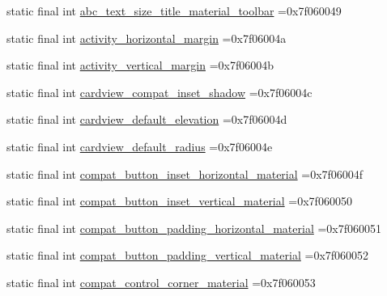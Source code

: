 \begin{DoxyCompactItemize}
\item 
static final int \mbox{\hyperlink{classbr_1_1unb_1_1cic_1_1mp_1_1marketmaster_1_1R_1_1dimen_ae527d11082d19eadaf91902af5296360}{abc\+\_\+text\+\_\+size\+\_\+title\+\_\+material\+\_\+toolbar}} =0x7f060049
\item 
static final int \mbox{\hyperlink{classbr_1_1unb_1_1cic_1_1mp_1_1marketmaster_1_1R_1_1dimen_a1b1c2b3ebf7bef5721d0a56ef94589ca}{activity\+\_\+horizontal\+\_\+margin}} =0x7f06004a
\item 
static final int \mbox{\hyperlink{classbr_1_1unb_1_1cic_1_1mp_1_1marketmaster_1_1R_1_1dimen_a741e01e4e126ddf97aeb83977e608c5b}{activity\+\_\+vertical\+\_\+margin}} =0x7f06004b
\item 
static final int \mbox{\hyperlink{classbr_1_1unb_1_1cic_1_1mp_1_1marketmaster_1_1R_1_1dimen_a0005323bb9a32e1b5fe860423cb68d1f}{cardview\+\_\+compat\+\_\+inset\+\_\+shadow}} =0x7f06004c
\item 
static final int \mbox{\hyperlink{classbr_1_1unb_1_1cic_1_1mp_1_1marketmaster_1_1R_1_1dimen_a559258cc7c40f5c895f09603185d84a9}{cardview\+\_\+default\+\_\+elevation}} =0x7f06004d
\item 
static final int \mbox{\hyperlink{classbr_1_1unb_1_1cic_1_1mp_1_1marketmaster_1_1R_1_1dimen_ac297ed2022422d29ec3f3d40bf2360aa}{cardview\+\_\+default\+\_\+radius}} =0x7f06004e
\item 
static final int \mbox{\hyperlink{classbr_1_1unb_1_1cic_1_1mp_1_1marketmaster_1_1R_1_1dimen_a669a8ad80d9d2fc021595c41594d84cd}{compat\+\_\+button\+\_\+inset\+\_\+horizontal\+\_\+material}} =0x7f06004f
\item 
static final int \mbox{\hyperlink{classbr_1_1unb_1_1cic_1_1mp_1_1marketmaster_1_1R_1_1dimen_a107a3a04a037388c893ea96dc92d57fb}{compat\+\_\+button\+\_\+inset\+\_\+vertical\+\_\+material}} =0x7f060050
\item 
static final int \mbox{\hyperlink{classbr_1_1unb_1_1cic_1_1mp_1_1marketmaster_1_1R_1_1dimen_a40c02c9955c2e61f85dfd673008de6a2}{compat\+\_\+button\+\_\+padding\+\_\+horizontal\+\_\+material}} =0x7f060051
\item 
static final int \mbox{\hyperlink{classbr_1_1unb_1_1cic_1_1mp_1_1marketmaster_1_1R_1_1dimen_a2b8a5f3f81c2ad1f74bf2f224fc360d2}{compat\+\_\+button\+\_\+padding\+\_\+vertical\+\_\+material}} =0x7f060052
\item 
static final int \mbox{\hyperlink{classbr_1_1unb_1_1cic_1_1mp_1_1marketmaster_1_1R_1_1dimen_ad8626d29cdf54ab167b2aa7c9d51a99d}{compat\+\_\+control\+\_\+corner\+\_\+material}} =0x7f060053

\end{DoxyCompactItemize}

